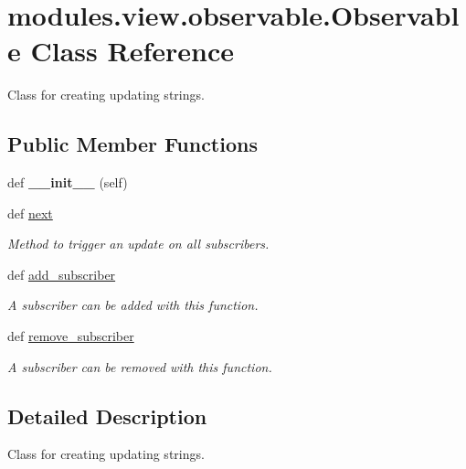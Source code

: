 \hypertarget{classmodules_1_1view_1_1observable_1_1_observable}{}\section{modules.\+view.\+observable.\+Observable Class Reference}
\label{classmodules_1_1view_1_1observable_1_1_observable}


Class for creating updating strings.  


\subsection*{Public Member Functions}
\begin{DoxyCompactItemize}
\item 
\mbox{\label{classmodules_1_1view_1_1observable_1_1_observable_ad15fa226b4f9a978fc0e105d6a06b181}} 
def {\bfseries \+\_\+\+\_\+init\+\_\+\+\_\+} (self)
\item 
def \mbox{\hyperlink{classmodules_1_1view_1_1observable_1_1_observable_a148631fbe8f3f1cf66dff03322a48882}{next}}
\begin{DoxyCompactList}\small\item\em Method to trigger an update on all subscribers. \end{DoxyCompactList}\item 
def \mbox{\hyperlink{classmodules_1_1view_1_1observable_1_1_observable_a1560584bfd33f7aac04c288723785264}{add\+\_\+subscriber}}
\begin{DoxyCompactList}\small\item\em A subscriber can be added with this function. \end{DoxyCompactList}\item 
def \mbox{\hyperlink{classmodules_1_1view_1_1observable_1_1_observable_a1545faf481765b0a7a7dd17b3e7c9c35}{remove\+\_\+subscriber}}
\begin{DoxyCompactList}\small\item\em A subscriber can be removed with this function. \end{DoxyCompactList}\end{DoxyCompactItemize}


\subsection{Detailed Description}
Class for creating updating strings. 

